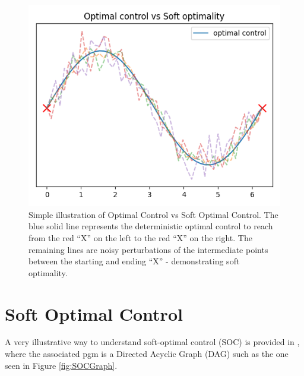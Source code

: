 \documentclass{report}
\numberwithin{equation}{section}
\numberwithin{figure}{section}
\numberwithin{table}{section}
\numberwithin{algorithm}{section}
\begin{document}
\begin{figure}[H]
  \begin{center}
    \includegraphics[scale=0.5]{optControlVsSoftOpt.png}
  \end{center}
  \caption{\label{fig:softopt}Simple illustration of Optimal 
  Control vs Soft Optimal 
  Control. The blue solid line represents the deterministic optimal 
  control to reach from the red ``X'' on the left to the 
  red ``X'' on the right. The remaining lines 
  are noisy perturbations of the intermediate points 
  between the starting and ending ``X'' - demonstrating 
  soft optimality.}
\end{figure}


\section{Soft Optimal Control}\label{sec:SOC}

A very illustrative way to understand soft-optimal control (SOC) 
is provided in \cite{LevineRLasInf}, where the associated 
pgm is a Directed Acyclic Graph (DAG) such as the one 
seen in Figure \ref{fig:SOCGraph}.
\end{document}
